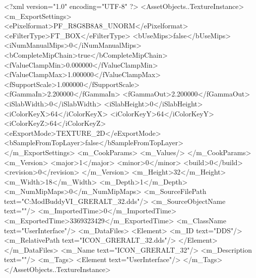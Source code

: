 <?xml version="1.0" encoding="UTF-8" ?>
<AssetObjects..TextureInstance>
	<m_ExportSettings>
		<ePixelformat>PF_R8G8B8A8_UNORM</ePixelformat>
		<eFilterType>FT_BOX</eFilterType>
		<bUseMips>false</bUseMips>
		<iNumManualMips>0</iNumManualMips>
		<bCompleteMipChain>true</bCompleteMipChain>
		<fValueClampMin>0.000000</fValueClampMin>
		<fValueClampMax>1.000000</fValueClampMax>
		<fSupportScale>1.000000</fSupportScale>
		<fGammaIn>2.200000</fGammaIn>
		<fGammaOut>2.200000</fGammaOut>
		<iSlabWidth>0</iSlabWidth>
		<iSlabHeight>0</iSlabHeight>
		<iColorKeyX>64</iColorKeyX>
		<iColorKeyY>64</iColorKeyY>
		<iColorKeyZ>64</iColorKeyZ>
		<eExportMode>TEXTURE_2D</eExportMode>
		<bSampleFromTopLayer>false</bSampleFromTopLayer>
	</m_ExportSettings>
	<m_CookParams>
		<m_Values/>
	</m_CookParams>
	<m_Version>
		<major>1</major>
		<minor>0</minor>
		<build>0</build>
		<revision>0</revision>
	</m_Version>
	<m_Height>32</m_Height>
	<m_Width>18</m_Width>
	<m_Depth>1</m_Depth>
	<m_NumMipMaps>0</m_NumMipMaps>
	<m_SourceFilePath text="C:\Users\asus\Documents\Firaxis ModBuddy\Civilization VI\temppic\ICON_GRERALT_32.dds"/>
	<m_SourceObjectName text=""/>
	<m_ImportedTime>0</m_ImportedTime>
	<m_ExportedTime>3369323429</m_ExportedTime>
	<m_ClassName text="UserInterface"/>
	<m_DataFiles>
		<Element>
			<m_ID text="DDS"/>
			<m_RelativePath text="ICON_GRERALT_32.dds"/>
		</Element>
	</m_DataFiles>
	<m_Name text="ICON_GRERALT_32"/>
	<m_Description text=""/>
	<m_Tags>
		<Element text="UserInterface"/>
	</m_Tags>
</AssetObjects..TextureInstance>

